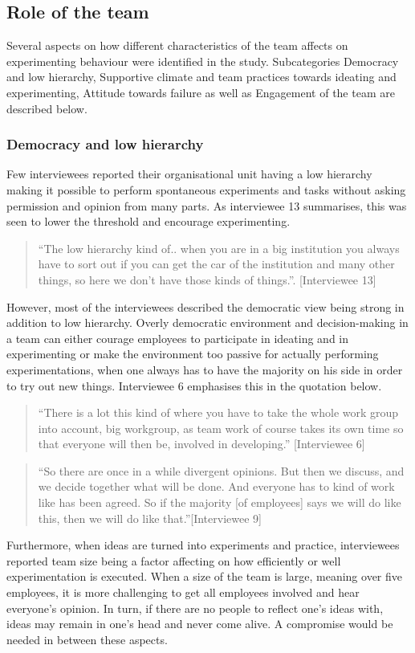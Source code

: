 \subsection{Role of the team}
Several aspects on how different characteristics of the team affects on experimenting behaviour were identified in the study. Subcategories Democracy and low hierarchy, Supportive climate and team practices towards ideating and experimenting, Attitude towards failure as well as Engagement of the team are described below.

\subsubsection{Democracy and low hierarchy}
Few interviewees reported their organisational unit having a low hierarchy making it possible to perform spontaneous experiments and tasks without asking permission and opinion from many parts. As interviewee 13 summarises, this was seen to lower the threshold and encourage experimenting.
\begin{quote}
``The low hierarchy kind of.. when you are in a big institution you always have to sort out if you can get the car of the institution and many other things, so here we don't have those kinds of things.''. [Interviewee 13]
\end{quote}
However, most of the interviewees described the democratic view being strong in addition to low hierarchy. Overly democratic environment and decision-making in a team can either courage employees to participate in ideating and in experimenting or make the environment too passive for actually performing experimentations, when one always has to have the majority on his side in order to try out new things. Interviewee 6 emphasises this in the quotation below. 
\begin{quote}
``There is a lot this kind of where you have to take the whole work group into account, big workgroup, as team work of course takes its own time so that everyone will then be, involved in developing.'' [Interviewee 6]
\end{quote}
\begin{quote}
``So there are once in a while divergent opinions. But then we discuss, and we decide together what will be done. And everyone has to kind of work like has been agreed. So if the majority [of employees] says we will do like this, then we will do like that.''[Interviewee 9]
\end{quote}
Furthermore, when ideas are turned into experiments and practice, interviewees reported team size being a factor affecting on how efficiently or well experimentation is executed. When a size of the team is large, meaning over five employees, it is more challenging to get all employees involved and hear everyone's opinion. In turn, if there are no people to reflect one's ideas with, ideas may remain in one's head and never come alive. A compromise would be needed in between these aspects. 

